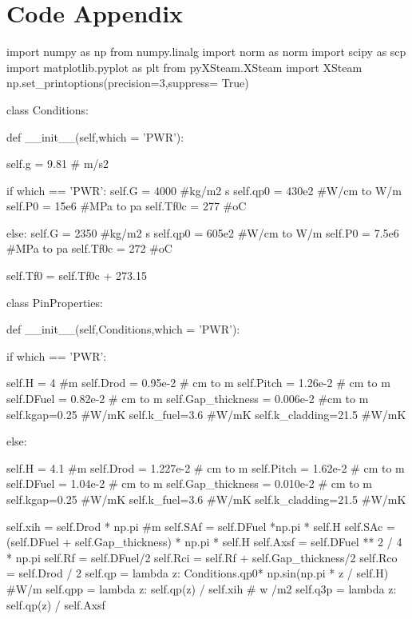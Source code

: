 \documentclass{article}
\begin{document}
\section{Code Appendix}
\begin{python}
    import numpy as np
from numpy.linalg import norm as norm
import scipy as scp
import matplotlib.pyplot as plt
from pyXSteam.XSteam import XSteam
np.set_printoptions(precision=3,suppress= True)

class Conditions:
    
    def __init__(self,which = 'PWR'):
        
        self.g = 9.81 # m/s2
        
        if which == 'PWR':
            self.G = 4000 #kg/m2 s
            self.qp0 = 430e2 #W/cm to W/m
            self.P0 = 15e6 #MPa to pa
            self.Tf0c = 277 #oC
        
        else:
            self.G = 2350 #kg/m2 s
            self.qp0 = 605e2 #W/cm to W/m
            self.P0 = 7.5e6 #MPa to pa
            self.Tf0c = 272 #oC
            
        self.Tf0 = self.Tf0c + 273.15

class PinProperties:
    
    def __init__(self,Conditions,which = 'PWR'):
    
        if which == 'PWR':
            
            self.H = 4 #m
            self.Drod = 0.95e-2 # cm to m 
            self.Pitch = 1.26e-2 # cm to m
            self.DFuel = 0.82e-2 # cm to m
            self.Gap_thickness = 0.006e-2 #cm to m
            self.kgap=0.25 #W/mK
            self.k_fuel=3.6 #W/mK
            self.k_cladding=21.5 #W/mK
        
        else:
            
            self.H = 4.1 #m
            self.Drod = 1.227e-2 # cm to m
            self.Pitch = 1.62e-2 # cm to m 
            self.DFuel = 1.04e-2 # cm to m 
            self.Gap_thickness = 0.010e-2 # cm to m
            self.kgap=0.25 #W/mK
            self.k_fuel=3.6 #W/mK
            self.k_cladding=21.5 #W/mK

        
        self.xih = self.Drod * np.pi #m
        self.SAf = self.DFuel *np.pi * self.H
        self.SAc = (self.DFuel + self.Gap_thickness) * np.pi * self.H
        self.Axsf = self.DFuel ** 2 / 4 * np.pi
        self.Rf = self.DFuel/2
        self.Rci = self.Rf + self.Gap_thickness/2
        self.Rco = self.Drod / 2 
        self.qp = lambda z: Conditions.qp0* np.sin(np.pi * z / self.H) #W/m
        self.qpp = lambda z: self.qp(z) / self.xih # w /m2
        self.q3p = lambda z: self.qp(z) / self.Axsf
        

\end{python}
\end{document}
